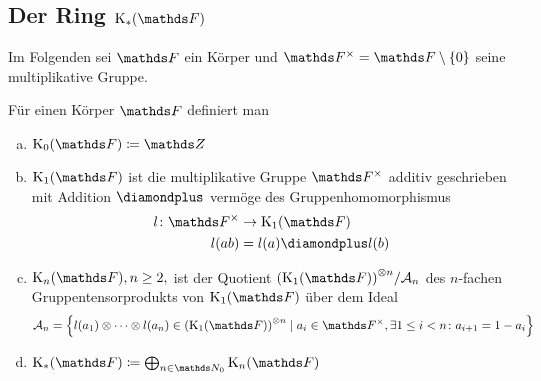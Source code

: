\documentclass[ngerman,fontsize=11pt, paper=a4, parskip=half, titlepage=true, toc=bib]{scrartcl}
\begin{document}
\subsection{Der Ring $\KF$}
Im Folgenden sei $\F$ ein Körper und $\Fx=\F\setminus \{0\}$ seine
multiplikative Gruppe.

\begin{Def}[$\KF$]\label{defkf}
  Für einen Körper $\F$ definiert man
  \begin{enumerate}[a)]
  \item $\K_0(\F)\coloneqq \Z$
  \item $\K_1(\F)$ ist die multiplikative Gruppe $\Fx$ 
    additiv geschrieben mit Addition $\p$
    vermöge des Gruppenhomomorphismus 
    \begin{align*}
      l\colon \Fx&\to \K_1(\F)\\
      l(ab)&=l(a)\p l(b)
    \end{align*}
  \item $\KnF, n\geq 2,$ ist der Quotient 
    ${(\K_1(\F))}^{\otimes n}/\calA_n$
    des $n$-fachen Gruppentensorprodukts von $\K_1(\F)$ über dem Ideal 
    \begin{gather*}
      \calA_n=\left\{ l(a_1)\otimes\dotsb\otimes l(a_n)
        \in {(\K_1(\F))}^{\otimes n}
        \mid  a_i\in\Fx,
        \exists 1\leq i < n \colon a_{i+1}=1-a_i \right\}
    \end{gather*}
  \item $\KF\coloneqq \bigoplus_{n\in\N_0}\KnF$
  \end{enumerate}
\end{Def}
\end{document}
